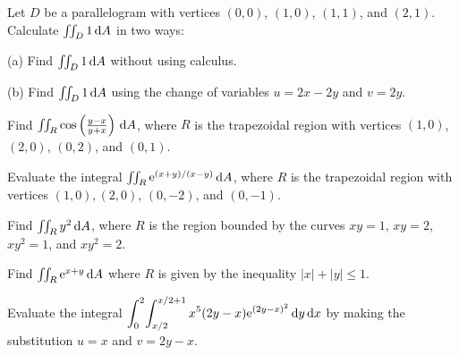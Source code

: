 \documentclass{watsonbook}
\begin{document}

\begin{aexercise}
  Let $D$ be a parallelogram with vertices $(0,0)$, $(1,0)$, $(1,1)$,
  and $(2,1)$. Calculate $\iint_D 1\,\mathrm{d} A$ in two ways:

  (a) Find $\iint_D 1\,\mathrm{d} A$ without using calculus.

  (b) Find $\iint_D 1\,\mathrm{d} A$ using the change of variables $u = 2x - 2y$
  and $v=2y$.
\end{aexercise}

\begin{aexercise}
  Find
  $\iint_R \cos \left(\frac{y-x}{y+x}\right) \, {\mathrm{d}}A$, where $R$ is the
  trapezoidal region with vertices $(1,0)$, $(2,0)$, $(0,2)$, and
  $(0,1)$.
\end{aexercise}

\begin{aexercise}
  Evaluate the integral $\iint_R \mathrm{e}^{(x+y)/(x-y)} \, {\mathrm{d}}A$, where $R$ is
  the trapezoidal region with vertices $(1,0), (2,0)$, $(0,-2)$, and
  $(0,-1)$.
\end{aexercise}

\begin{aexercise}
  Find $\iint_R y^2 \, {\mathrm{d}}A$, where $R$ is the region bounded by the
  curves $xy = 1$, $xy = 2$, $xy^2 = 1$, and $xy^2 = 2$.
\end{aexercise}

\begin{aexercise}
  Find $\iint_R \mathrm{e}^{x+y} \, {\mathrm{d}}A$ where $R$ is given by the inequality
  $|x| + |y| \leq 1$.
\end{aexercise}

\begin{aexercise}
  Evaluate the integral
  $\displaystyle{\int_{0}^{2}\!\int_{x/2}^{x/2+1} x^5 (2y -
    x)\mathrm{e}^{(2y-x)^2} \,\mathrm{d}y\,\mathrm{d}x}$ by making the substitution $u = x$ and
  $v=2y-x$.
\end{aexercise}

\end{document}
